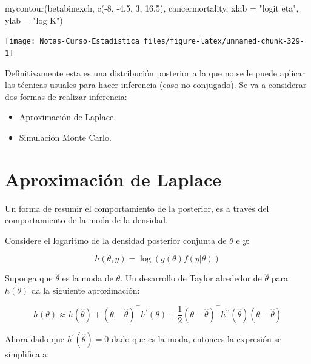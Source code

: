 \documentclass[
  12pt,
]{book}
\newenvironment{Shaded}{\begin{snugshade}}{\end{snugshade}}
\newcommand{\AttributeTok}[1]{\textcolor[rgb]{0.77,0.63,0.00}{#1}}
\newcommand{\DecValTok}[1]{\textcolor[rgb]{0.00,0.00,0.81}{#1}}
\newcommand{\FloatTok}[1]{\textcolor[rgb]{0.00,0.00,0.81}{#1}}
\newcommand{\FunctionTok}[1]{\textcolor[rgb]{0.00,0.00,0.00}{#1}}
\newcommand{\NormalTok}[1]{#1}
\newcommand{\SpecialCharTok}[1]{\textcolor[rgb]{0.00,0.00,0.00}{#1}}
\newcommand{\StringTok}[1]{\textcolor[rgb]{0.31,0.60,0.02}{#1}}
\providecommand{\tightlist}{%
  \setlength{\itemsep}{0pt}\setlength{\parskip}{0pt}}
\theoremstyle{definition}
\theoremstyle{definition}
\theoremstyle{definition}
\theoremstyle{definition}
\theoremstyle{remark}
\begin{document}
\begin{Shaded}
\begin{Highlighting}[]
\FunctionTok{mycontour}\NormalTok{(betabinexch, }\FunctionTok{c}\NormalTok{(}\SpecialCharTok{{-}}\DecValTok{8}\NormalTok{, }\SpecialCharTok{{-}}\FloatTok{4.5}\NormalTok{, }\DecValTok{3}\NormalTok{, }\FloatTok{16.5}\NormalTok{), cancermortality,}
    \AttributeTok{xlab =} \StringTok{"logit eta"}\NormalTok{, }\AttributeTok{ylab =} \StringTok{"log K"}\NormalTok{)}
\end{Highlighting}
\end{Shaded}

\begin{center}\texttt{[image: Notas-Curso-Estadistica\_files/figure-latex/unnamed-chunk-329-1]} \end{center}

Definitivamente esta es una distribución posterior a la que no se le puede aplicar las técnicas usuales para hacer inferencia (caso no conjugado). Se va a considerar dos formas de realizar inferencia:

\begin{itemize}
\tightlist
\item
  Aproximación de Laplace.
\item
  Simulación Monte Carlo.
\end{itemize}

\hypertarget{aproximaciuxf3n-de-laplace}{%
\section{Aproximación de Laplace}\label{aproximaciuxf3n-de-laplace}}

Un forma de resumir el comportamiento de la posterior, es a través del comportamiento de la moda de la densidad.

Considere el logaritmo de la densidad posterior conjunta de \(\theta\) e \(y\):

\[h(\theta,y)=\log(g(\theta)f(y|\theta))\]

Suponga que \(\hat \theta\) es la moda de \(\theta\). Un desarrollo de Taylor alrededor de \(\hat \theta\) para \(h(\theta)\) da la siguiente aproximación:

\[h(\theta)\approx h(\hat \theta)+ (\theta - \hat{\theta})^{\top}h^{\prime}(\theta) + \frac{1}{2}(\theta-\hat \theta)^\top h^{\prime\prime}(\hat \theta)(\theta-\hat \theta)\]

Ahora dado que \(h^{\prime}(\hat{\theta})=0\) dado que es la moda, entonces la expresión se simplifica a:
\end{document}
